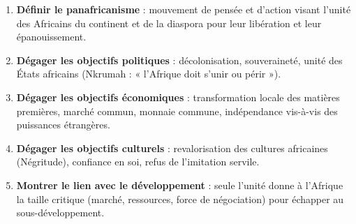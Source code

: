 \documentclass[11pt]{article}
\newcommand{\cle}[1]{{\popxbold\color{popdark}#1}}
\begin{document}
\begin{methode}
\begin{enumerate}
\item \textbf{Définir le panafricanisme} : mouvement de pensée et d'action visant l'\cle{unité} des Africains du continent et de la diaspora pour leur libération et leur épanouissement.
\item \textbf{Dégager les objectifs politiques} : décolonisation, souveraineté, unité des États africains (Nkrumah : « l'Afrique doit s'unir ou périr »).
\item \textbf{Dégager les objectifs économiques} : transformation locale des matières premières, marché commun, monnaie commune, indépendance vis-à-vis des puissances étrangères.
\item \textbf{Dégager les objectifs culturels} : revalorisation des cultures africaines (Négritude), confiance en soi, refus de l'imitation servile.
\item \textbf{Montrer le lien avec le développement} : seule l'unité donne à l'Afrique la taille critique (marché, ressources, force de négociation) pour échapper au sous-développement.
\end{enumerate}
\end{methode}
\end{document}
